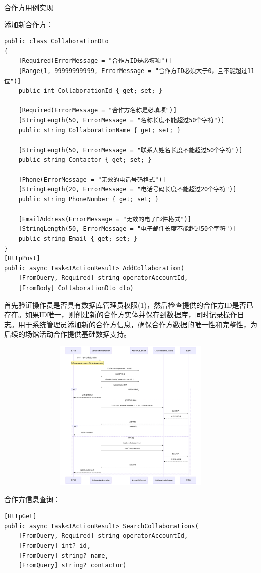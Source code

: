\documentclass[]{article}
\begin{document}
合作方用例实现

添加新合作方：

\begin{verbatim}
public class CollaborationDto
{
    [Required(ErrorMessage = "合作方ID是必填项")]
    [Range(1, 99999999999, ErrorMessage = "合作方ID必须大于0，且不能超过11位")]
    public int CollaborationId { get; set; }

    [Required(ErrorMessage = "合作方名称是必填项")]
    [StringLength(50, ErrorMessage = "名称长度不能超过50个字符")]
    public string CollaborationName { get; set; }

    [StringLength(50, ErrorMessage = "联系人姓名长度不能超过50个字符")]
    public string Contactor { get; set; }

    [Phone(ErrorMessage = "无效的电话号码格式")]
    [StringLength(20, ErrorMessage = "电话号码长度不能超过20个字符")]
    public string PhoneNumber { get; set; }

    [EmailAddress(ErrorMessage = "无效的电子邮件格式")]
    [StringLength(50, ErrorMessage = "电子邮件长度不能超过50个字符")]
    public string Email { get; set; }
}
[HttpPost]
public async Task<IActionResult> AddCollaboration(
    [FromQuery, Required] string operatorAccountId,
    [FromBody] CollaborationDto dto)
\end{verbatim}

首先验证操作员是否具有数据库管理员权限(1)，然后检查提供的合作方ID是否已存在。如果ID唯一，则创建新的合作方实体并保存到数据库，同时记录操作日志。用于系统管理员添加新的合作方信息，确保合作方数据的唯一性和完整性，为后续的场馆活动合作提供基础数据支持。

\includegraphics[width=5.64167in,height=2.86458in]{media/media/image_2-4-5.png}

合作方信息查询：

\begin{verbatim}
[HttpGet]
public async Task<IActionResult> SearchCollaborations(
    [FromQuery, Required] string operatorAccountId,
    [FromQuery] int? id,
    [FromQuery] string? name,
    [FromQuery] string? contactor)
\end{verbatim}
\end{document}
